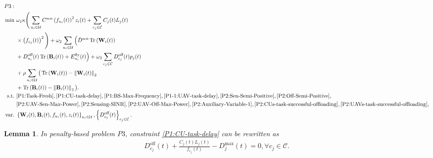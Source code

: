 \documentclass[10pt,journal,compsoc]{IEEEtran}
\newtheorem{lemma}{\textbf{Lemma}}
\begin{document}
\begin{align}
P3:\,\, & \notag\\
    \min \,\, &\omega_{1}\kappa \Bigg(\sum_{u_{i} \in \mathcal{U}} C^{\text{sen}} \left(f_{u_{i}}(t)\right)^{2} z_{i}(t) + \sum_{c_{j} \in \mathcal{C}} C_{{j}}(t) L_{j}(t) \notag \\
    & \times \left(f_{c_{j}}(t)\right)^{2} \Bigg) + \omega_{2}\sum_{u_{i} \in \mathcal{U}} \Big(\bar{D}^{\text{sen}}\operatorname{Tr}\left(\mathbf{W}_{i}(t)\right) \notag \\ 
    & + D_{u_{i}}^{\text{off}}(t) \operatorname{Tr}\left(\mathbf{B}_{i}(t)\right) + E_{u_{i}}^{\text{fly}}(t)\Big) + \omega_{3}\sum_{c_{j} \in \mathcal{C}}D_{c_{j}}^{\text{off}}(t)p_{j}(t)  \notag\\
    & + \rho \sum_{u_{i} \in \mathcal{U}}\big(\operatorname{Tr}\left(\mathbf{W}_{i}(t)\right) - \left\|\mathbf{W}_{i}(t)\right\|_{2} \notag \\
    & + \operatorname{Tr}\left(\mathbf{B}_{i}(t)\right) - \left\|\mathbf{B}_{i}(t)\right\|_{2}\big). \notag \\
    \text{s.t.}\,\,& \eqref{P1:Task-Fresh}, \eqref{P1:CU-task-delay}, \eqref{P1:BS-Max-Frequency}, \eqref{P1-1:UAV-task-delay}, \eqref{P2:Sen-Semi-Positive}, \eqref{P2:Off-Semi-Positive}, \notag \\
    & \eqref{P2:UAV-Sen-Max-Power}, \eqref{P2:Sensing-SINR}, \eqref{P2:UAV-Off-Max-Power}, \eqref{P2:Auxiliary-Variable-1}, \eqref{P2:CUs-task-successful-offloading}, \eqref{P2:UAVs-task-successful-offloading}, \notag \\
    \text{var.}\,\, & \left\{\mathbf{W}_{i}(t), \mathbf{B}_{i}(t), f_{u_{i}}(t), z_{i}(t)\right\}_{u_{i} \in \mathcal{U}}, \left\{D_{c_{j}}^{\text{off}}(t)\right\}_{c_{j} \in \mathcal{C}}.  \notag
\end{align}
\begin{lemma}\label{lemma:CU-Frequency}
    In penalty-based problem $P3$, constraint \eqref{P1:CU-task-delay} can be rewritten as
    \begin{align}\label{lemma1:equation}
        D_{c_{j}}^{\text{off}}(t) + \frac{C_{{j}}(t)L_{j}(t)}{f_{c_{j}}(t)} - D^{\max}_{j}(t)= 0, \forall c_{j} \in \mathcal{C}.
    \end{align}
\end{lemma}
\end{document}
